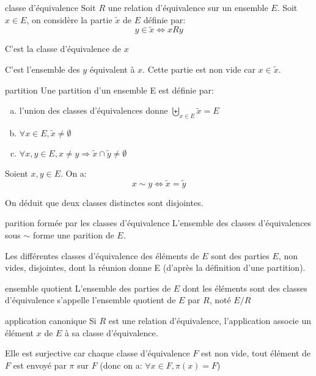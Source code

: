 \begin{definition}{classe d'équivalence}{}
    Soit $R$ une relation d'équivalence sur un ensemble $E$.
    Soit $x \in E$, on considère la partie $\tilde{x}$ de $E$ définie par:
    \[ y \in \tilde{x} \Leftrightarrow x R y \]

    \noindent
    C'est la classe d'équivalence de $x$
\end{definition}

C'est l'ensemble des $y$ équivalent à $x$. Cette partie est non vide car $x \in \tilde{x}$.

\begin{definition}{partition}{}
    Une partition d'un ensemble E est définie par:
    \begin{enumerate}[(a)]
        \item l'union des classes d'équivalences donne $\displaystyle \biguplus_{x \in E} \tilde{x} = E$
        \item $\forall x \in E, \tilde{x} \neq \emptyset$
        \item $\forall x, y \in E, x \neq y \Rightarrow \tilde{x} \cap \tilde{y} \neq \emptyset$
    \end{enumerate}
\end{definition}

\begin{lemma}{}{}
    Soient $x, y \in E$. On a:
    \[ x \sim y \Longleftrightarrow \tilde{x} = \tilde{y} \]
\end{lemma}

On déduit que deux classes distinctes sont disjointes.

\begin{theorem}{parition formée par les classes d'équivalence}{}
    L'ensemble des classes d'équivalences sous $\sim$ forme une parition de $E$.
\end{theorem}

Les différentes classes d'équivalence des éléments de $E$ sont des parties $E$, non vides, disjointes, dont la réunion donne E (d'après la définition d'une partition).

\begin{definition}{ensemble quotient}{}
    L'ensemble des parties de $E$ dont les éléments sont des classes d'équivalence s'appelle l'ensemble quotient de $E$ par $R$,
    noté $E/R$
\end{definition}

\begin{proposition}{application canonique}{}
    Si $R$ est une relation d'équivalence, l'application 
    associe un élément $x$ de $E$ à sa classe d'équivalence.

    Elle est surjective car chaque classe d'équivalence $F$ est non vide, tout élément de $F$ est envoyé par
    $\pi$ sur $F$ (donc on a: $\forall x \in F, \pi(x) = F$)
\end{proposition}






